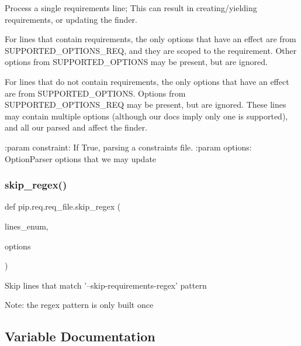 \begin{DoxyVerb}Process a single requirements line; This can result in creating/yielding
requirements, or updating the finder.

For lines that contain requirements, the only options that have an effect
are from SUPPORTED_OPTIONS_REQ, and they are scoped to the
requirement. Other options from SUPPORTED_OPTIONS may be present, but are
ignored.

For lines that do not contain requirements, the only options that have an
effect are from SUPPORTED_OPTIONS. Options from SUPPORTED_OPTIONS_REQ may
be present, but are ignored. These lines may contain multiple options
(although our docs imply only one is supported), and all our parsed and
affect the finder.

:param constraint: If True, parsing a constraints file.
:param options: OptionParser options that we may update
\end{DoxyVerb}
 \mbox{\label{namespacepip_1_1req_1_1req__file_a71e94b4017adf080ca2de297a0e39d54}} 
\subsubsection{\texorpdfstring{skip\+\_\+regex()}{skip\_regex()}}
{\footnotesize\ttfamily def pip.\+req.\+req\+\_\+file.\+skip\+\_\+regex (\begin{DoxyParamCaption}\item[{}]{lines\+\_\+enum,  }\item[{}]{options }\end{DoxyParamCaption})}

\begin{DoxyVerb}Skip lines that match '--skip-requirements-regex' pattern

Note: the regex pattern is only built once
\end{DoxyVerb}
 

\subsection{Variable Documentation}
\mbox{\label{namespacepip_1_1req_1_1req__file_ada542f178a89b18ec4cbc886f3ccf47b}} 
